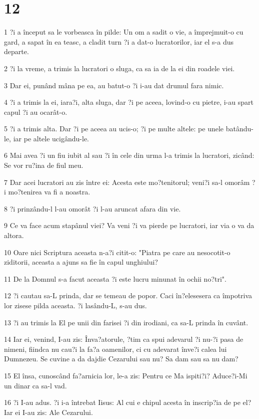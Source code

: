 \chapter{12}

\par 1 ?i a început sa le vorbeasca în pilde: Un om a sadit o vie, a împrejmuit-o cu gard, a sapat în ea teasc, a cladit turn ?i a dat-o lucratorilor, iar el s-a dus departe.
\par 2 ?i la vreme, a trimis la lucratori o sluga, ca sa ia de la ei din roadele viei.
\par 3 Dar ei, punând mâna pe ea, au batut-o ?i i-au dat drumul fara nimic.
\par 4 ?i a trimis la ei, iara?i, alta sluga, dar ?i pe aceea, lovind-o cu pietre, i-au spart capul ?i au ocarât-o.
\par 5 ?i a trimis alta. Dar ?i pe aceea au ucis-o; ?i pe multe altele: pe unele batându-le, iar pe altele ucigându-le.
\par 6 Mai avea ?i un fiu iubit al sau ?i în cele din urma l-a trimis la lucratori, zicând: Se vor ru?ina de fiul meu.
\par 7 Dar acei lucratori au zis între ei: Acesta este mo?tenitorul; veni?i sa-l omorâm ?i mo?tenirea va fi a noastra.
\par 8 ?i prinzându-l l-au omorât ?i l-au aruncat afara din vie.
\par 9 Ce va face acum stapânul viei? Va veni ?i va pierde pe lucratori, iar via o va da altora.
\par 10 Oare nici Scriptura aceasta n-a?i citit-o: "Piatra pe care au nesocotit-o ziditorii, aceasta a ajuns sa fie în capul unghiului?
\par 11 De la Domnul s-a facut aceasta ?i este lucru minunat în ochii no?tri".
\par 12 ?i cautau sa-L prinda, dar se temeau de popor. Caci în?elesesera ca împotriva lor zisese pilda aceasta. ?i lasându-L, s-au dus.
\par 13 ?i au trimis la El pe unii din farisei ?i din irodiani, ca sa-L prinda în cuvânt.
\par 14 Iar ei, venind, I-au zis: Înva?atorule, ?tim ca spui adevarul ?i nu-?i pasa de nimeni, fiindca nu cau?i la fa?a oamenilor, ci cu adevarat înve?i calea lui Dumnezeu. Se cuvine a da dajdie Cezarului sau nu? Sa dam sau sa nu dam?
\par 15 El însa, cunoscând fa?arnicia lor, le-a zis: Pentru ce Ma ispiti?i? Aduce?i-Mi un dinar ca sa-l vad.
\par 16 ?i I-au adus. ?i i-a întrebat Iisus: Al cui e chipul acesta în inscrip?ia de pe el? Iar ei I-au zis: Ale Cezarului.
